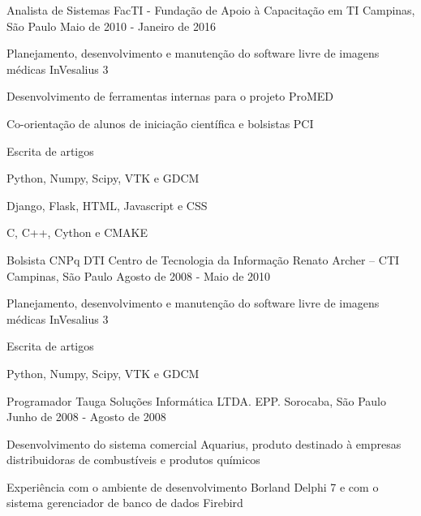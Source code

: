 \begin{cventries}
  \cventry
    {Analista de Sistemas}
    {FacTI - Fundação de Apoio à Capacitação em TI}
    {Campinas, São Paulo}
    {Maio de 2010 - Janeiro de 2016}
    {
      \begin{cvitems}
        \item {Planejamento, desenvolvimento e manutenção do software livre de imagens médicas InVesalius 3}
        \item {Desenvolvimento de ferramentas internas para o projeto ProMED}
        \item {Co-orientação de alunos de iniciação científica e bolsistas PCI}
        \item {Escrita de artigos}
        \item {Python, Numpy, Scipy, VTK e GDCM}
        \item {Django, Flask, HTML, Javascript e CSS}
        \item {C, C++, Cython e CMAKE}
      \end{cvitems}
    }
  
  \cventry
  {Bolsista CNPq DTI}
  {Centro de Tecnologia da Informação Renato Archer – CTI}
  {Campinas, São Paulo}
  {Agosto de 2008 - Maio de 2010}
  {
  	\begin{cvitems}
        \item {Planejamento, desenvolvimento e manutenção do software livre de imagens médicas InVesalius 3}
        \item {Escrita de artigos}
        \item {Python, Numpy, Scipy, VTK e GDCM}
    \end{cvitems}
  }
  
  \cventry
  {Programador}
  {Tauga Soluções Informática LTDA. EPP.}
  {Sorocaba, São Paulo}
  {Junho de 2008 - Agosto de 2008}
  {
  \begin{cvitems}
  	\item{Desenvolvimento do sistema comercial Aquarius, produto destinado à empresas distribuidoras de combustíveis e produtos químicos}
    \item {Experiência com o ambiente de desenvolvimento Borland Delphi 7 e com o sistema gerenciador de banco de dados Firebird}
   \end{cvitems}
  }

\end{cventries}
